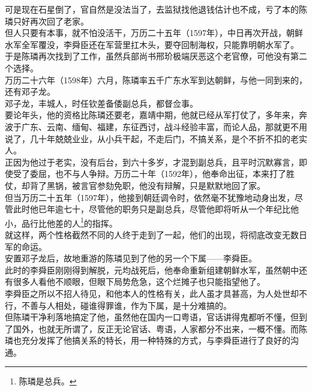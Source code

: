 \begin{multicols}{\theparacolNo}
可是现在石星倒了，官自然是没法当了，去监狱找他退钱估计也不成，亏了本的陈璘只好再次回了老家。\\

但人只要有本事，就不怕没活干，万历二十五年（1597年），中日再次开战，朝鲜水军全军覆没，李舜臣还在军营里扛木头，要夺回制海权，只能靠明朝水军了。\\

于是陈璘再次找到了工作，虽然兵部尚书邢玠极端厌恶这个老官僚，可他没有第二个选择。\\

万历二十六年（1598年）六月，陈璘率五千广东水军到达朝鲜，与他一同到来的，还有邓子龙。\\

邓子龙，丰城人，时任钦差备倭副总兵，都督佥事。\\

要论年头，他的资格比陈璘还要老，嘉靖中期，他就已经从军打仗了，多年来，奔波于广东、云南、缅甸、福建，东征西讨，战斗经验丰富，而论人品，那就更不用说了，几十年兢兢业业，从小兵干起，不走后门，不搞关系，是个不折不扣的老实人。\\

正因为他过于老实，没有后台，到六十多岁，才混到副总兵，且平时沉默寡言，即使受了委屈，也不与人争辩。万历二十年（1592年），他奉命出征，本来打了胜仗，却背了黑锅，被言官参劾免职，他没有辩解，只是默默地回了家。\\

但当万历二十五年（1597年），他接到朝廷调令时，依然毫不犹豫地动身出发，尽管此时他已年逾七十，尽管他的职务只是副总兵，尽管他即将听从一个年纪比他小，品行比他差的人\footnote{陈璘是总兵。}的指挥。\\

就这样，两个性格截然不同的人终于走到了一起，他们的出现，将彻底改变无数日军的命运。\\

安置邓子龙后，故地重游的陈璘见到了他的另一个下属——李舜臣。\\

此时的李舜臣刚刚得到解脱，元均战死后，他奉命重新组建朝鲜水军，虽然朝中还有很多人看他不顺眼，但眼下局势危急，这个烂摊子也只能指望他了。\\

李舜臣之所以不招人待见，和他本人的性格有关，此人虽才具甚高，为人处世却不行，不善与人相处，碰谁得罪谁，作为下属，是十分难搞的。\\

但陈璘干净利落地搞定了他，虽然他在国内一口粤语，官话讲得鬼都听不懂，但到了国外，也就无所谓了，反正无论官话、粤语，人家都分不出来，一概不懂。而陈璘也充分发挥了他搞关系的特长，用一种特殊的方式，与李舜臣进行了良好的沟通。\\


\end{multicols}
